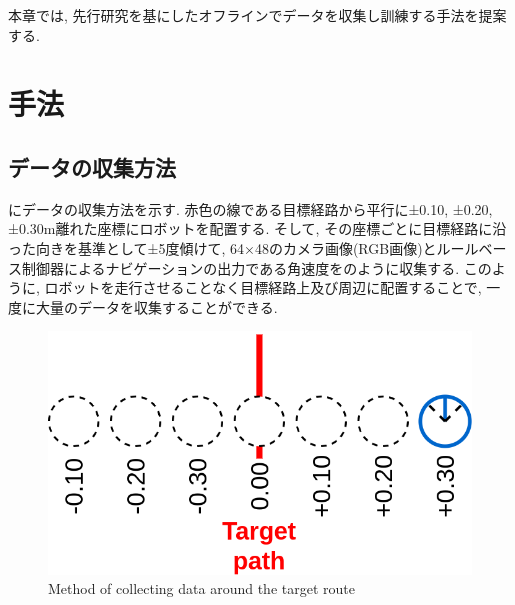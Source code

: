 
本章では, 先行研究を基にしたオフラインでデータを収集し訓練する手法を提案する.

\section{手法}

\subsection{データの収集方法}
にデータの収集方法を示す. 赤色の線である目標経路から平行に±0.10, ±0.20, ±0.30m離れた座標にロボットを配置する. そして, その座標ごとに目標経路に沿った向きを基準として±5度傾けて, 64×48のカメラ画像(RGB画像)とルールベース制御器によるナビゲーションの出力である角速度をのように収集する. このように, ロボットを走行させることなく目標経路上及び周辺に配置することで, 一度に大量のデータを収集することができる.


\begin{figure}[h]
  \centering
  \includegraphics[keepaspectratio, scale=0.25]{images/old-method.png}
  \caption{Method of collecting data around the target route}
  \label{Fig:old-method}
  \end{figure}

